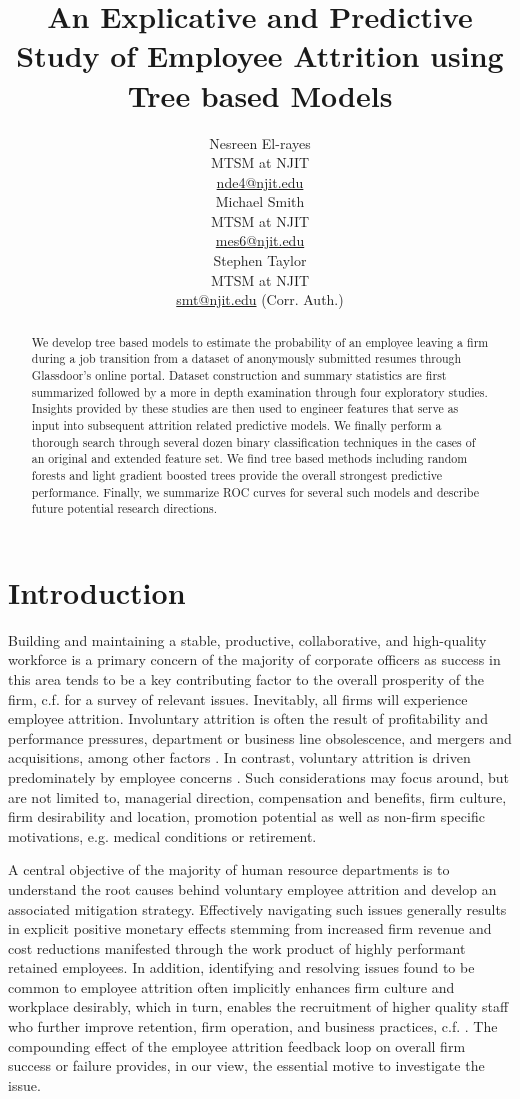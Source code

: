 \documentclass[10pt]{article}
\title{An Explicative and Predictive Study of Employee Attrition using Tree based Models}
\author{Nesreen El-rayes\\
  MTSM at NJIT \\
  {\underline{nde4@njit.edu}} \\\And
  Michael Smith\\
  MTSM at NJIT \\
  {\underline{mes6@njit.edu}}\\\And 
  Stephen Taylor\\
  MTSM at NJIT \\
  {\underline{smt@njit.edu} (Corr. Auth.)} \\}
\date{}
\begin{document}
\maketitle
\begin{abstract}
We develop tree based models to estimate the probability of an employee leaving a 
firm during a job transition from a dataset of anonymously submitted resumes 
through Glassdoor's online portal.  Dataset  construction and summary 
statistics are first summarized followed by a more in depth examination  
through four exploratory studies.  Insights provided by these studies are then 
used to engineer features that serve as input into subsequent attrition related 
predictive models.  We finally perform a thorough search through several dozen binary 
classification techniques in the cases of an original and extended feature set.  
We find tree based methods including random forests and light gradient boosted trees 
provide the overall strongest predictive performance.  Finally, we summarize ROC curves 
for several such models and describe future potential research directions. 
\end{abstract}

\section{Introduction}
Building and maintaining a stable, productive, collaborative, and high-quality workforce is a primary concern 
of the majority of corporate officers as success in this area tends to be a key contributing factor to the 
overall prosperity of the firm, c.f. \cite{Mir1993} for a survey of relevant issues.
Inevitably, all firms will experience employee attrition.  
Involuntary attrition is often the result of profitability and performance pressures, department or business 
line obsolescence, and mergers and acquisitions, among other factors \cite{Datta2009,Grip2006,SHAU1998}.  In contrast,
voluntary attrition is driven predominately by employee concerns \cite{Singh2012}.  Such considerations 
may focus around, but are not limited to, managerial direction, compensation and benefits, firm culture, 
firm desirability and location, promotion potential as well as non-firm specific motivations, e.g. medical 
conditions or retirement. 
  
A central objective of the majority of human resource departments is to understand the root causes 
behind voluntary employee attrition and develop an associated mitigation strategy.  Effectively 
navigating such issues generally results in explicit positive monetary effects stemming from increased 
firm revenue and cost reductions manifested through the work product of highly performant retained employees. 
In addition, identifying and resolving issues found to be common to employee attrition often implicitly 
enhances firm culture and workplace desirably, which in turn, enables the recruitment of higher quality 
staff who further improve retention, firm operation, and business practices, c.f.  \cite{Cook1986,Free1994}.  
The compounding effect of the employee attrition feedback loop on overall firm
success or failure provides, in our view, the essential motive to 
investigate the issue. 
\end{document}
